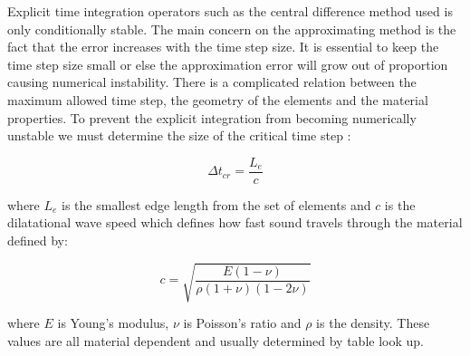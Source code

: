 Explicit time integration operators such as the central difference
method used is only conditionally stable. The main concern on the
approximating method is the fact that the error increases with the
time step size.
It is essential to keep the time step size small or else the
approximation error will grow out of proportion causing numerical
instability.
There is a complicated relation between the maximum allowed time step,
the geometry of the elements and the material properties. To prevent
the explicit integration from becoming numerically unstable we must
determine the size of the critical time
step : 

\begin{equation}
\label{eq:delta-t-cr}
  \Delta t_{cr} = \frac{L_e}{c}
\end{equation}


where $L_e$ is the smallest edge length from the set of elements and
$c$ is the dilatational wave speed which defines how
fast sound travels through the material defined by:

\begin{equation*}
c = \sqrt{\frac{E(1-\nu)}{\rho(1+\nu)(1-2\nu)}}
\end{equation*}


where $E$ is Young's modulus, $\nu$ is Poisson's ratio and $\rho$ is
the density. These values are all material dependent and usually
determined by table look up. \\


